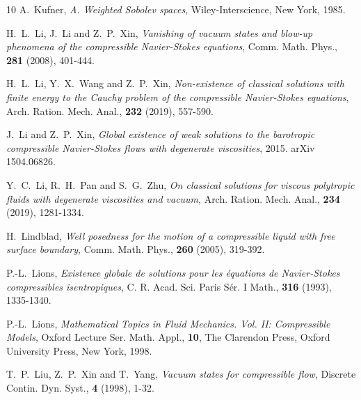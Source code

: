 \documentclass[11pt, reqno]{amsart}
\numberwithin{equation}{section}
\begin{document}
{\begin{thebibliography}{10}
 {\sc A.~Kufner}, {\em A. Weighted Sobolev spaces}, Wiley-Interscience, New York, 1985.

{\sc H.~L.~Li, J.~Li and Z.~P.~Xin}, {\em Vanishing of vacuum states and blow-up phenomena of the compressible Navier-Stokes equations}, Comm. Math. Phys., {\bf 281} (2008), 401-444.


{\sc H.~L.~Li, Y.~X.~Wang and Z.~P.~Xin}, {\em Non-existence of classical solutions with finite energy to the Cauchy problem of the compressible Navier-Stokes equations}, Arch. Ration. Mech. Anal., {\bf 232} (2019), 557-590.

{\sc J.~Li and Z.~P.~Xin}, {\em Global existence of weak solutions to the barotropic compressible Navier-Stokes flows with degenerate viscosities}, 2015. arXiv 1504.06826.

{\sc Y.~C.~Li, R.~H.~Pan and S.~G.~Zhu}, {\em On classical solutions for viscous polytropic fluids with degenerate viscosities and vacuum}, Arch. Ration. Mech. Anal., {\bf 234} (2019), 1281-1334.


{\sc H.~Lindblad}, {\em Well posedness for the motion of a compressible liquid with free surface boundary}, Comm. Math. Phys., {\bf 260} (2005), 319-392.


{\sc P.-L.~Lions}, {\em Existence globale de solutions pour les \'equations de Navier-Stokes compressibles isentropiques}, C. R. Acad. Sci. Paris S\'er. I Math., {\bf 316} (1993), 1335-1340.


{\sc P.-L.~Lions}, {\em Mathematical Topics in Fluid Mechanics. Vol. II: Compressible
Models}, Oxford Lecture Ser. Math. Appl., {\bf 10}, The Clarendon Press, Oxford University Press, New York, 1998.






{\sc T.~P.~Liu, Z.~P.~Xin and T.~Yang}, {\em Vacuum states for compressible flow}, Discrete Contin. Dyn. Syst., {\bf 4} (1998), 1-32.





\end{thebibliography}}
\end{document}
